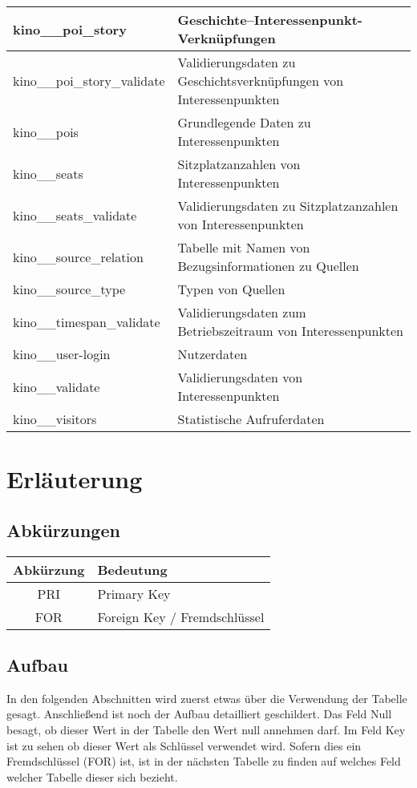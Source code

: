 \begin{longtable}[H]{|l|p{9cm}|}
	kino\_\_poi\_story 				& Geschichte--Interessenpunkt-Verknüpfungen \\ \hline
	kino\_\_poi\_story\_validate 	& Validierungsdaten zu Geschichtsverknüpfungen von Interessenpunkten \\ \hline
	kino\_\_pois 					& Grundlegende Daten zu Interessenpunkten \\ \hline
	kino\_\_seats 					& Sitzplatzanzahlen von Interessenpunkten\\ \hline
	kino\_\_seats\_validate 		& Validierungsdaten zu Sitzplatzanzahlen von Interessenpunkten \\ \hline
	kino\_\_source\_relation        & Tabelle mit Namen von Bezugsinformationen zu Quellen \\ \hline
	kino\_\_source\_type            & Typen von Quellen \\ \hline
	kino\_\_timespan\_validate 		& Validierungsdaten zum Betriebszeitraum von Interessenpunkten \\ \hline
	kino\_\_user-login 				& Nutzerdaten \\ \hline
	kino\_\_validate 				& Validierungsdaten von Interessenpunkten \\ \hline
	kino\_\_visitors 				& Statistische Aufruferdaten \\ \hline
\end{longtable}
\newpage
\section{Erläuterung}
\subsection{Abkürzungen}
\begin{table}[H]
	\begin{tabular}{|c|p{12cm}|}
		\hline
		\textbf{Abkürzung} & \textbf{Bedeutung} \\ \hline
		PRI & Primary Key \\ \hline
		FOR & Foreign Key / Fremdschlüssel \\ \hline
	\end{tabular}
\end{table}
\subsection{Aufbau}
In den folgenden Abschnitten wird zuerst etwas über die Verwendung der Tabelle gesagt. Anschließend ist noch der Aufbau detailliert geschildert. Das Feld {\glqq Null\grqq} besagt, ob dieser Wert in der Tabelle den Wert {\glqq null\grqq} annehmen darf. Im Feld {\glqq Key\grqq} ist zu sehen ob dieser Wert als Schlüssel verwendet wird. Sofern dies ein Fremdschlüssel ({\glqq FOR\grqq}) ist, ist in der nächsten Tabelle zu finden auf welches Feld welcher Tabelle dieser sich bezieht.
